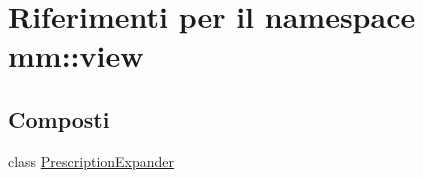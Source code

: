 \hypertarget{namespacemm_1_1view}{}\section{Riferimenti per il namespace mm\+:\+:view}
\label{namespacemm_1_1view}
\subsection*{Composti}
\begin{DoxyCompactItemize}
\item 
class \hyperlink{classmm_1_1view_1_1_prescription_expander}{Prescription\+Expander}
\end{DoxyCompactItemize}
